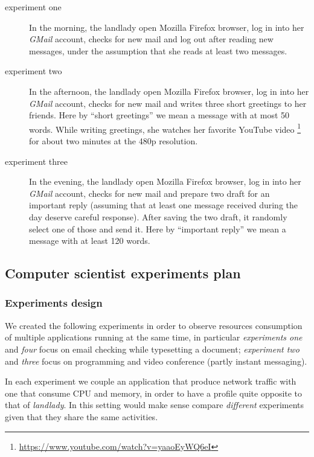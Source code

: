 \documentclass[10pt,a4paper]{article}
\begin{document}
    \begin{description}
    \item[experiment one] In the morning, the landlady open Mozilla
      Firefox browser, log in into her \emph{GMail} account, checks for
      new mail and log out after reading new messages, under the
      assumption that she reads at least two messages.
    \item[experiment two] In the afternoon, the landlady open Mozilla
      Firefox browser, log in into her \emph{GMail} account, checks
      for new mail and writes three short greetings to her
      friends. Here by ``short greetings'' we mean a message with at
      most 50 words.  While writing greetings, she watches her
      favorite YouTube video
      \footnote{\url{https://www.youtube.com/watch?v=yaaoEyWQ6eI}} for
      about two minutes at the 480p resolution.
    \item[experiment three] In the evening, the landlady open Mozilla
      Firefox browser, log in into her \emph{GMail} account, checks for
      new mail and prepare two draft for an important reply (assuming
      that at least one message received during the day deserve
      careful response). After saving the two draft, it randomly
      select one of those and send it. Here by ``important reply'' we
      mean a message with at least 120 words.
    \end{description}

    \newpage
    \subsection{Computer scientist experiments plan}

    \subsubsection*{Experiments design }
    We created the following experiments in order to observe resources
    consumption of multiple applications running at the same time, in
    particular \emph{experiments one} and \emph{four} focus on email
    checking while typesetting a document; \emph{experiment two} and
    \emph{three} focus on programming and video conference (partly
    instant messaging).

    In each experiment we couple an application that produce network
    traffic with one that consume CPU and memory, in order to have a
    profile quite opposite to that of \emph{landlady}. In this setting
    would make sense compare \emph{different} experiments given that
    they share the same activities.
\end{document}
